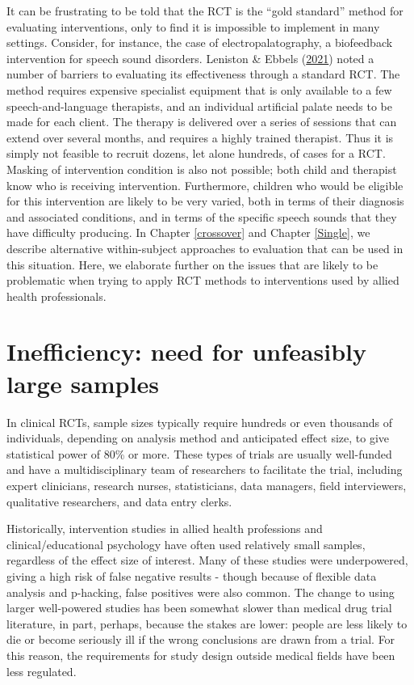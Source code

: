 \documentclass{krantz}
\begin{document}
It can be frustrating to be told that the RCT is the ``gold standard'' method for evaluating interventions, only to find it is impossible to implement in many settings. Consider, for instance, the case of electropalatography, a biofeedback intervention for speech sound disorders. Leniston \& Ebbels (\protect\hyperlink{ref-leniston2021}{2021}) noted a number of barriers to evaluating its effectiveness through a standard RCT. The method requires expensive specialist equipment that is only available to a few speech-and-language therapists, and an individual artificial palate needs to be made for each client. The therapy is delivered over a series of sessions that can extend over several months, and requires a highly trained therapist. Thus it is simply not feasible to recruit dozens, let alone hundreds, of cases for a RCT. Masking of intervention condition is also not possible; both child and therapist know who is receiving intervention. Furthermore, children who would be eligible for this intervention are likely to be very varied, both in terms of their diagnosis and associated conditions, and in terms of the specific speech sounds that they have difficulty producing. In Chapter \ref{crossover} and Chapter \ref{Single}, we describe alternative within-subject approaches to evaluation that can be used in this situation. Here, we elaborate further on the issues that are likely to be problematic when trying to apply RCT methods to interventions used by allied health professionals.

\hypertarget{inefficiency-need-for-unfeasibly-large-samples}{%
\section{Inefficiency: need for unfeasibly large samples}\label{inefficiency-need-for-unfeasibly-large-samples}}

In clinical RCTs, sample sizes typically require hundreds or even thousands of individuals, depending on analysis method and anticipated effect size, to give statistical power of 80\% or more. These types of trials are usually well-funded and have a multidisciplinary team of researchers to facilitate the trial, including expert clinicians, research nurses, statisticians, data managers, field interviewers, qualitative researchers, and data entry clerks.

Historically, intervention studies in allied health professions and clinical/educational psychology have often used relatively small samples, regardless of the effect size of interest. Many of these studies were underpowered, giving a high risk of false negative results - though because of flexible data analysis and p-hacking, false positives were also common. The change to using larger well-powered studies has been somewhat slower than medical drug trial literature, in part, perhaps, because the stakes are lower: people are less likely to die or become seriously ill if the wrong conclusions are drawn from a trial. For this reason, the requirements for study design outside medical fields have been less regulated.
\end{document}
